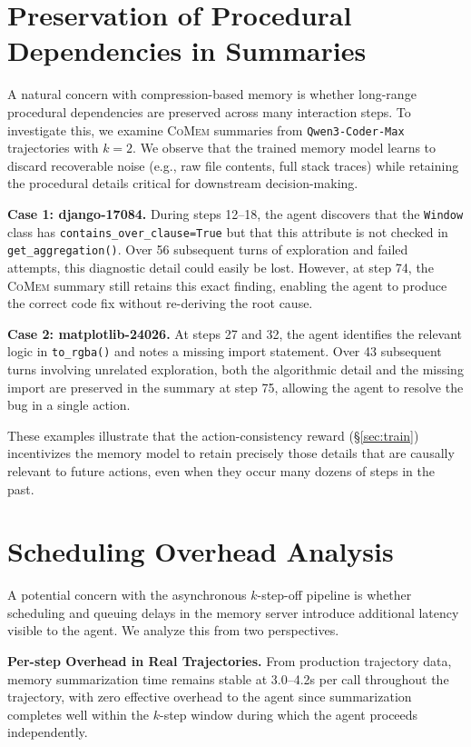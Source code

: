 \documentclass{article}
\theoremstyle{plain}
\theoremstyle{definition}
\theoremstyle{remark}
\newcommand{\model}{\textsc{CoMem}\xspace}
\begin{document}
\section{Preservation of Procedural Dependencies in Summaries}
\label{app:case_study}

A natural concern with compression-based memory is whether long-range procedural dependencies are preserved across many interaction steps. To investigate this, we examine {\model} summaries from \texttt{Qwen3-Coder-Max} trajectories with $k=2$. We observe that the trained memory model learns to discard recoverable noise (e.g., raw file contents, full stack traces) while retaining the procedural details critical for downstream decision-making.

\noindent \textbf{Case 1: django-17084.}
During steps 12--18, the agent discovers that the \texttt{Window} class has \texttt{contains\_over\_clause=True} but that this attribute is not checked in \texttt{get\_aggregation()}. Over 56 subsequent turns of exploration and failed attempts, this diagnostic detail could easily be lost. However, at step 74, the {\model} summary still retains this exact finding, enabling the agent to produce the correct code fix without re-deriving the root cause.

\noindent \textbf{Case 2: matplotlib-24026.}
At steps 27 and 32, the agent identifies the relevant logic in \texttt{to\_rgba()} and notes a missing import statement. Over 43 subsequent turns involving unrelated exploration, both the algorithmic detail and the missing import are preserved in the summary at step 75, allowing the agent to resolve the bug in a single action.

These examples illustrate that the action-consistency reward (\S\ref{sec:train}) incentivizes the memory model to retain precisely those details that are causally relevant to future actions, even when they occur many dozens of steps in the past.

\section{Scheduling Overhead Analysis}
\label{app:scheduling}

A potential concern with the asynchronous $k$-step-off pipeline is whether scheduling and queuing delays in the memory server introduce additional latency visible to the agent. We analyze this from two perspectives.

\noindent \textbf{Per-step Overhead in Real Trajectories.}
From production trajectory data, memory summarization time remains stable at 3.0--4.2s per call throughout the trajectory, with zero effective overhead to the agent since summarization completes well within the $k$-step window during which the agent proceeds independently.
\end{document}
